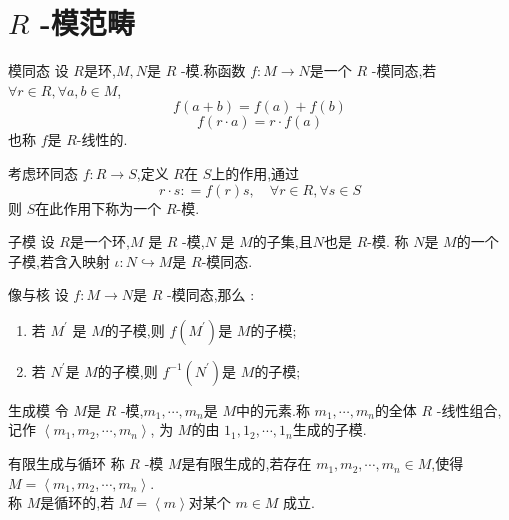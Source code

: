 \documentclass[lang=cn,12pt,color=green,fontset=none,pad]{elegantbook}
\begin{document}
\section{$ R $ -模范畴}

\begin{definition}{模同态}
    设 $ R $是环,$ M,N $是 $ R $ -模.称函数 $ f:M \to N $是一个 $ R $ -模同态,若 $ \forall r \in R,\forall a,b \in M $, $$
    f\left( a+ b \right)= f\left( a \right) + f\left( b \right)$$  $$
     f\left( r\cdot a \right)=r \cdot f\left( a \right)    
    $$    也称 $ f $是 $ R $-线性的.  
\end{definition}

\begin{example}
    考虑环同态 \(  f:R\to S  \),定义 \(  R  \)在 \(  S  \)上的作用,通过 \[
    r\cdot s: = f\left( r \right)s,\quad \forall r\in R ,\forall s \in S
    \]   则 \(  S  \)在此作用下称为一个 \(  R  \)-模.  
\end{example}

\begin{definition}{子模}
    设 $ R $是一个环,$ M $ 是 $ R $ -模,$ N $ 是 $ M $的子集,且$ N $也是 $ R $-模. 称 $ N $是 $ M $的一个子模,若含入映射 $ \iota: N \hookrightarrow M $是 $ R $-模同态.       
\end{definition}

\begin{proposition}{像与核}
    设 $ f:M\to N $是 $ R $  -模同态,那么 :
    \begin{enumerate}
    \item 若 $ M^{\prime}  $ 是 $ M $的子模,则 $ f\left( M^{\prime}  \right)  $是 $ M $的子模;
    \item 若 $ N^{\prime}  $是 $ M $的子模,则 $ f^{-1} \left( N^{\prime}  \right)  $是 $ M $的子模;       
    \end{enumerate}
    
\end{proposition}

\begin{definition}{生成模}
令 $ M $是 $ R $ -模,$ m_1,\cdots ,m_{n} $是 $ M $中的元素.称 $ m_1,\cdots ,m_{n} $的全体 $ R $ -线性组合,记作 $ \left<m_1,m_2,\cdots,m_n \right> $,
为  $ M $的由 $ 1_1,1_2,\cdots,1_n $生成的子模.       
\end{definition}

\begin{definition}{有限生成与循环}
    称 $ R $ -模 $ M $是有限生成的,若存在 $ m_1,m_2,\cdots,m_n  \in  M $,使得 $ M= \left<m_1,m_2,\cdots,m_n \right> $.\\ 
     称 $ M $是循环的,若 $ M = \left<m \right> $对某个 $  m \in M $      成立.
\end{definition}
\end{document}
